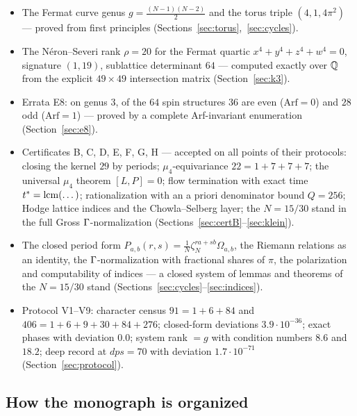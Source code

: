 \begin{statusbox}
\begin{itemize}[leftmargin=1.4em, itemsep=0.15em]
\item The Fermat curve genus $g=\tfrac{(N-1)(N-2)}{2}$ and the torus
  triple $(4,1,4\pi^2)$ --- proved from first principles
  (Sections~\ref{sec:torus},~\ref{sec:cycles}).
\item The N\'eron--Severi rank $\rho=20$ for the Fermat quartic
  $x^4+y^4+z^4+w^4=0$, signature $(1,19)$, sublattice determinant
  $64$ --- computed exactly over $\mathbb{Q}$ from the explicit
  $49\times49$ intersection matrix (Section~\ref{sec:k3}).
\item Errata E8: on genus $3$, of the $64$ spin structures $36$ are
  even ($\mathrm{Arf}=0$) and $28$ odd ($\mathrm{Arf}=1$) --- proved by a complete Arf-invariant
  enumeration (Section~\ref{sec:e8}).
\item Certificates B, C, D, E, F, G, H --- accepted on all points of
  their protocols: closing the kernel $29$ by periods;
  $\mu_4$-equivariance $22=1+7+7+7$; the universal $\mu_4$ theorem
  $[L,P]=0$; flow termination with exact time $t^*=\operatorname{lcm}(\dots)$;
  rationalization with an a priori denominator bound $Q=256$; Hodge
  lattice indices and the Chowla--Selberg layer; the $N=15/30$ stand
  in the full Gross $\Gamma$-normalization
  (Sections~\ref{sec:certB}--\ref{sec:klein}).
\item The closed period form $P_{a,b}(r,s)=\tfrac1N\zeta_N^{ra+sb}
  \Omega_{a,b}$, the Riemann relations as an identity, the
  $\Gamma$-normalization with fractional shares of $\pi$, the
  polarization and computability of indices --- a closed system of
  lemmas and theorems of the $N=15/30$ stand
  (Sections~\ref{sec:cycles}--\ref{sec:indices}).
\item Protocol V1--V9: character census $91=1+6+84$ and
  $406=1+6+9+30+84+276$; closed-form deviations $3.9\cdot10^{-36}$;
  exact phases with deviation $0.0$; system rank $=g$ with condition
  numbers $8.6$ and $18.2$; deep record at $dps=70$ with deviation
  $1.7\cdot10^{-71}$ (Section~\ref{sec:protocol}).
\end{itemize}
\end{statusbox}

\subsection{How the monograph is organized}


